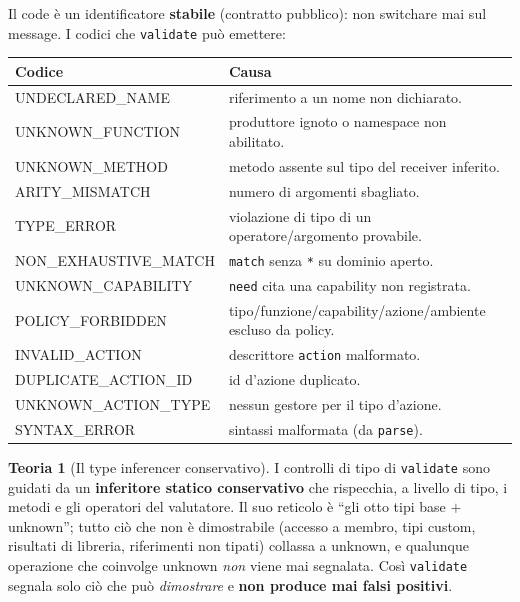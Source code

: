 \documentclass[11pt,a4paper]{book}
\let\code\lstinline
\newcommand{\ic}[1]{{\ttfamily #1}}
\theoremstyle{definition}
\newtheorem*{teoria}{Teoria}
\begin{document}
{{{{Il \ic{code} è un identificatore \textbf{stabile} (contratto pubblico): non
switchare mai sul \ic{message}. I codici che \code|validate| può emettere:

\begin{center}
\small
\begin{tabular}{@{}l p{9.2cm}@{}}
\toprule
\textbf{Codice} & \textbf{Causa} \\
\midrule
\ic{UNDECLARED\_NAME} & riferimento a un nome non dichiarato. \\
\ic{UNKNOWN\_FUNCTION} & produttore ignoto o namespace non abilitato. \\
\ic{UNKNOWN\_METHOD} & metodo assente sul tipo del receiver inferito. \\
\ic{ARITY\_MISMATCH} & numero di argomenti sbagliato. \\
\ic{TYPE\_ERROR} & violazione di tipo di un operatore/argomento provabile. \\
\ic{NON\_EXHAUSTIVE\_MATCH} & \code|match| senza \code|*| su dominio aperto. \\
\ic{UNKNOWN\_CAPABILITY} & \code|need| cita una capability non registrata. \\
\ic{POLICY\_FORBIDDEN} & tipo/funzione/capability/azione/ambiente escluso da policy. \\
\ic{INVALID\_ACTION} & descrittore \code|action| malformato. \\
\ic{DUPLICATE\_ACTION\_ID} & id d'azione duplicato. \\
\ic{UNKNOWN\_ACTION\_TYPE} & nessun gestore per il tipo d'azione. \\
\ic{SYNTAX\_ERROR} & sintassi malformata (da \code|parse|). \\
\bottomrule
\end{tabular}
\end{center}

\begin{teoria}[Il type inferencer conservativo]
I controlli di tipo di \code|validate| sono guidati da un \textbf{inferitore
statico conservativo} che rispecchia, a livello di tipo, i metodi e gli operatori
del valutatore. Il suo reticolo è ``gli otto tipi base $+$ \ic{unknown}''; tutto ciò
che non è dimostrabile (accesso a membro, tipi custom, risultati di libreria,
riferimenti non tipati) collassa a \ic{unknown}, e qualunque operazione che
coinvolge \ic{unknown} \emph{non} viene mai segnalata. Così \code|validate| segnala
solo ciò che può \emph{dimostrare} e \textbf{non produce mai falsi positivi}.
\end{teoria}

}}}}
\end{document}
